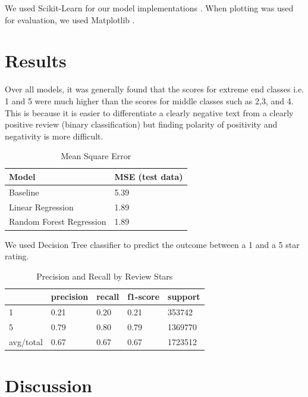 \documentclass[12pt]{article}
\begin{document}
We used Scikit-Learn for our model implementations \cite{sklearnl76:online, 32432skl20:online,
  sklearnt25:online}. When plotting was used for evaluation, we used
Matplotlib \cite{Matplotl1:online}. 

\section{Results}

Over all models, it was generally found that the scores for extreme end classes i.e. 1 and 5 
were much higher than the scores for middle classes such as 2,3, and 4. This is because it is 
easier to differentiate a clearly negative text from a clearly positive review (binary classification)
but finding polarity of positivity and negativity is more difficult.

\begin{table}[h]
  \caption{Mean Square Error}
  \centering
  \begin{tabular}{|l|l|}
    \hline
    \textbf{Model}    & \textbf{MSE (test data)} \\
    \hline
    Baseline          & 5.39 \\
    \hline
    Linear Regression & 1.89 \\
    \hline
    Random Forest Regression & 1.89 \\
    \hline
  \end{tabular}
  \end{table}
  
  We used Decision Tree classifier to predict the outcome between a 1 and a 5 star rating.
  
  \begin{table}[h]
	\caption{Precision and Recall by Review Stars}
	\centering
	\begin{tabular}{|l|l|l|l|l|}
	\hline
    \textbf{} & \textbf{precision} & \textbf{recall} & \textbf{f1-score} & \textbf{support} \\
	\hline 
	1         & 0.21      & 0.20   & 0.21     & 353742  \\
	\hline 
	5         & 0.79      & 0.80   & 0.79     & 1369770 \\
 	\hline 
 	avg/total & 0.67      & 0.67   & 0.67     & 1723512 \\
 	\hline
\end{tabular}
\end{table}


\section{Discussion}
\end{document}
